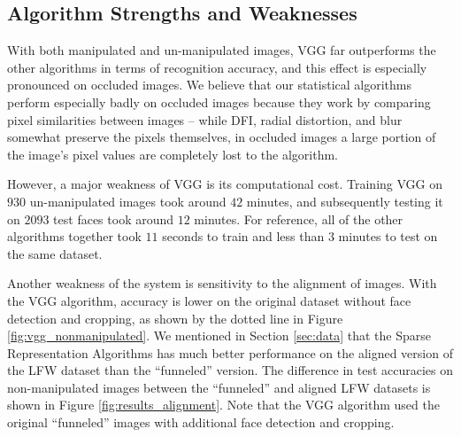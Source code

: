\documentclass[pageno]{cos429}
\begin{document}
\subsection*{Algorithm Strengths and Weaknesses}
With both manipulated and un-manipulated images, VGG far outperforms the other algorithms in terms of recognition accuracy, and this effect is especially pronounced on occluded images. We believe that our statistical algorithms perform especially badly on occluded images because they work by comparing pixel similarities between images -- while DFI, radial distortion, and blur somewhat preserve the pixels themselves, in occluded images a large portion of the image's pixel values are completely lost to the algorithm.

However, a major weakness of VGG is its computational cost. Training VGG on $930$ un-manipulated images took around $42$ minutes, and subsequently testing it on $2093$ test faces took around $12$ minutes. For reference, all of the other algorithms together took $11$ seconds to train and less than $3$ minutes to test on the same dataset.

Another weakness of the system is sensitivity to the alignment of images. With the VGG algorithm, accuracy is lower on the original dataset without face detection and cropping, as shown by the dotted line in Figure \ref{fig:vgg_nonmanipulated}. We mentioned in Section \ref{sec:data} that the Sparse Representation Algorithms has much better performance on the aligned version of the LFW dataset than the ``funneled'' version. The difference in test accuracies on non-manipulated images between the ``funneled'' and aligned LFW datasets is shown in Figure \ref{fig:results_alignment}. Note that the VGG algorithm used the original ``funneled'' images with additional face detection and cropping.
\end{document}
